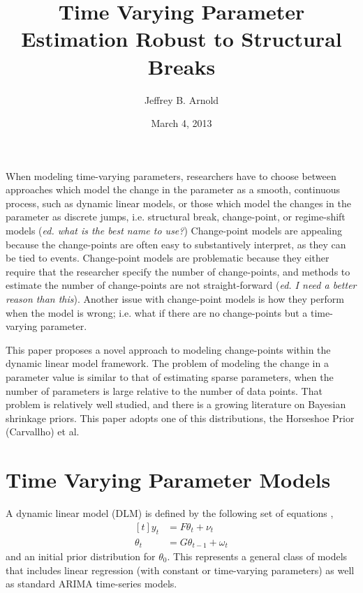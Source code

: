 \documentclass{article}
\author{Jeffrey B. Arnold}
\title{Time Varying Parameter Estimation Robust to Structural Breaks}
\date{March 4, 2013}
\begin{document}
\maketitle{}

When modeling time-varying parameters, researchers have to choose between approaches which model the change in the parameter as a smooth, continuous process, such as dynamic linear models, or those which model the changes in the parameter as discrete jumps, i.e. structural break, change-point, or regime-shift models (\textit{ed. what is the best name to use?})
Change-point models are appealing because the change-points are often easy to substantively interpret, as they can be tied to events.
Change-point models are problematic because they either require that the researcher specify the number of change-points, and methods to estimate the number of change-points are not straight-forward (\textit{ed. I need a better reason than this}).
Another issue with change-point models is how they perform when the model is wrong; i.e. what if there are no change-points but a time-varying parameter.

This paper proposes a novel approach to modeling change-points within the dynamic linear model framework.
The problem of modeling the change in a parameter value is similar to that of estimating sparse parameters, when the number of parameters is large relative to the number of data points.
That problem is relatively well studied, and there is a growing literature on Bayesian shrinkage priors.
This paper adopts one of this distributions, the Horseshoe Prior (Carvallho) et al. 

\section{Time Varying Parameter Models}
\label{sec:time-vary-param}

A dynamic linear model (DLM) is defined by the following set of equations \parencites{WestHarrison1997}{CommandeurKoopman2007.pdf},
\begin{equation}
  \label{eq:9}
  \begin{aligned}[t]
    y_{t} &= F \theta_{t} + \nu_{t} \\
    \theta_{t} &= G \theta_{t - 1} + \omega_{t} 
  \end{aligned}
\end{equation}
and an initial prior distribution for $\theta_{0}$.
This represents a general class of models that includes linear regression (with constant or time-varying parameters) as well as standard ARIMA time-series models.
\end{document}

